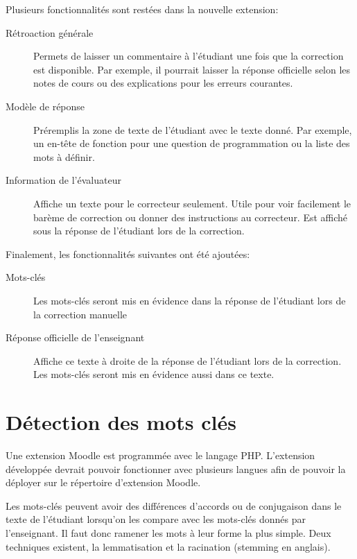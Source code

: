 Plusieurs fonctionnalités sont restées dans la nouvelle extension:

\begin{description}
  \item[Rétroaction générale]
  
  Permets de laisser un commentaire à l'étudiant une fois que la correction est disponible. Par exemple, il pourrait laisser la réponse officielle selon les notes de cours ou des explications pour les erreurs courantes.
  
  \item[Modèle de réponse]
  
  Préremplis la zone de texte de l'étudiant avec le texte donné. Par exemple, un en-tête de fonction pour une question de programmation ou la liste des mots à définir.
  
  \item[Information de l'évaluateur]
  
  Affiche un texte pour le correcteur seulement. Utile pour voir facilement le barème de correction ou donner des instructions au correcteur. Est affiché sous la réponse de l'étudiant lors de la correction.
\end{description}

Finalement, les fonctionnalités suivantes ont été ajoutées:

\begin{description}
  \item[Mots-clés]
  
  Les mots-clés seront mis en évidence dans la réponse de l'étudiant lors de la correction manuelle

  \item[Réponse officielle de l'enseignant]
  
  Affiche ce texte à droite de la réponse de l'étudiant lors de la correction. Les mots-clés seront mis en évidence aussi dans ce texte.
\end{description}

\section{Détection des mots clés}

Une extension Moodle est programmée avec le langage PHP. L'extension développée devrait pouvoir fonctionner avec plusieurs langues afin de pouvoir la déployer sur le répertoire d'extension Moodle.

Les mots-clés peuvent avoir des différences d'accords ou de conjugaison dans le texte de l'étudiant lorsqu'on les compare avec les mots-clés donnés par l'enseignant. Il faut donc ramener les mots à leur forme la plus simple. Deux techniques existent, la lemmatisation et la racination (stemming en anglais).

